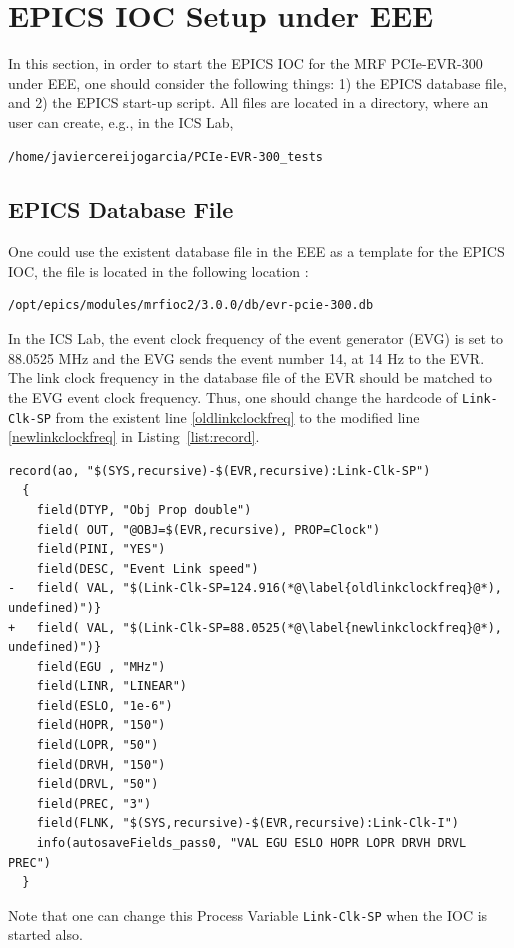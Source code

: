 \documentclass[11pt
  , a4paper
  , article
  , oneside
  , showtrims
]{memoir}
\begin{document}
\clearpage
\section{EPICS IOC Setup under EEE}
In this section, in order to start the EPICS IOC for the MRF PCIe-EVR-300 under EEE, one should consider the following things: 1) the EPICS database file, and 2) the EPICS start-up script. All files are located in a directory, where an user can create, e.g., in the ICS Lab, 
\begin{lstlisting}[style=termstyle, label={list:pwd}, caption={Working Directory in the ICS lab.} ]
  /home/javiercereijogarcia/PCIe-EVR-300_tests
\end{lstlisting}

\subsection{EPICS Database File}
One could use the existent database file in the EEE as a template for the EPICS IOC, the file is located in the following location : 
\begin{lstlisting}[style=termstyle]
  /opt/epics/modules/mrfioc2/3.0.0/db/evr-pcie-300.db
\end{lstlisting}

In the ICS Lab, the event clock frequency of the event generator (EVG) is set to 88.0525 MHz and the EVG sends the event number 14, at 14 Hz to the EVR. The link clock frequency in the database file of the EVR should be matched to the EVG event clock frequency. Thus, one should change the hardcode of \texttt{Link-Clk-SP} from the existent line \ref{oldlinkclockfreq} to  the modified line \ref{newlinkclockfreq} in Listing~\ref{list:record}. 
\begin{lstlisting}[style=termstylenumber, label={list:record}, caption={The record has the link clock frequency.}] 
  record(ao, "$(SYS,recursive)-$(EVR,recursive):Link-Clk-SP")
  {
    field(DTYP, "Obj Prop double")
    field( OUT, "@OBJ=$(EVR,recursive), PROP=Clock")
    field(PINI, "YES")
    field(DESC, "Event Link speed")
-   field( VAL, "$(Link-Clk-SP=124.916(*@\label{oldlinkclockfreq}@*), undefined)")}
+   field( VAL, "$(Link-Clk-SP=88.0525(*@\label{newlinkclockfreq}@*), undefined)")}
    field(EGU , "MHz")
    field(LINR, "LINEAR")
    field(ESLO, "1e-6")
    field(HOPR, "150")
    field(LOPR, "50")
    field(DRVH, "150")
    field(DRVL, "50")
    field(PREC, "3")
    field(FLNK, "$(SYS,recursive)-$(EVR,recursive):Link-Clk-I")
    info(autosaveFields_pass0, "VAL EGU ESLO HOPR LOPR DRVH DRVL PREC")
  }
\end{lstlisting}
Note that one can change this Process Variable \texttt{Link-Clk-SP} when the IOC is started also. 
\end{document}
